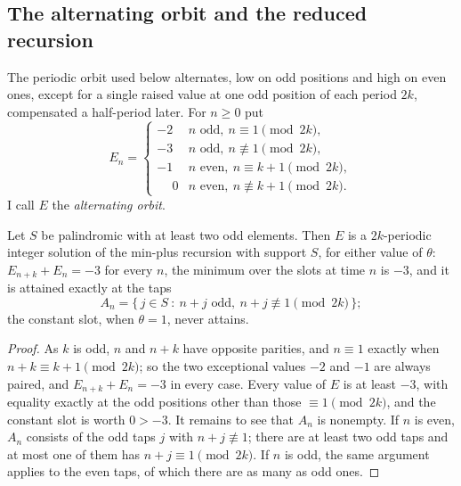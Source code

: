 \subsection{The alternating orbit and the reduced recursion}
\label{sec:odd-carrier}

The periodic orbit used below alternates, low on odd positions and high on
even ones, except for a single raised value at one odd position of each
period $2k$, compensated a half-period later. For $n\ge0$ put
\begin{equation}
E_n=\begin{cases}
-2 & n \text{ odd},\ n\equiv1 \pmod{2k},\\
-3 & n \text{ odd},\ n\not\equiv1 \pmod{2k},\\
-1 & n \text{ even},\ n\equiv k+1 \pmod{2k},\\
\phantom{-}0 & n \text{ even},\ n\not\equiv k+1 \pmod{2k}.
\end{cases}
\end{equation}
I call $E$ the \emph{alternating orbit}.

\begin{lemma}
\label{lem:odd-carrier}
Let $S$ be palindromic with at least two odd elements. Then $E$ is a
$2k$-periodic integer solution of the min-plus recursion with support $S$,
for either value of $\theta$: $E_{n+k}+E_n=-3$ for every $n$, the minimum
over the slots at time $n$ is $-3$, and it is attained exactly at the taps
\begin{equation}
A_n=\{\,j\in S\ :\ n+j \text{ odd},\ n+j\not\equiv1\pmod{2k}\,\};
\end{equation}
the constant slot, when $\theta=1$, never attains.
\end{lemma}

\begin{proof}
As $k$ is odd, $n$ and $n+k$ have opposite parities, and $n\equiv1$ exactly
when $n+k\equiv k+1 \pmod{2k}$; so the two exceptional values $-2$ and $-1$
are always paired, and $E_{n+k}+E_n=-3$ in every case. Every value of $E$ is
at least $-3$, with equality exactly at the odd positions other than those
$\equiv1\pmod{2k}$, and the constant slot is worth $0>-3$. It remains to see
that $A_n$ is nonempty. If $n$ is even, $A_n$ consists of the odd taps $j$
with $n+j\not\equiv1$; there are at least two odd taps and at most one of
them has $n+j\equiv1\pmod{2k}$. If $n$ is odd, the same argument applies to
the even taps, of which there are as many as odd ones.
\end{proof}

